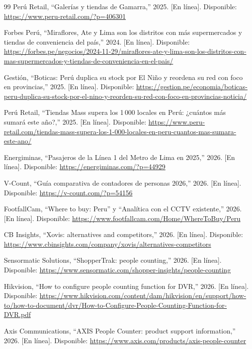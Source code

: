 \documentclass[12pt,a4paper]{article}
\begin{document}
\begin{thebibliography}{99}
Perú Retail, ``Galerías y tiendas de Gamarra,'' 2025. [En línea]. Disponible:
\url{https://www.peru-retail.com/?p=406301}

Forbes Perú, ``Miraflores, Ate y Lima son los distritos con más supermercados y
tiendas de conveniencia del país,'' 2024. [En línea]. Disponible:
\url{https://forbes.pe/negocios/2024-11-29/miraflores-ate-y-lima-son-los-distritos-con-mas-supermercados-y-tiendas-de-conveniencia-en-el-pais/}

Gestión, ``Boticas: Perú duplica su stock por El Niño y reordena su red con foco
en provincias,'' 2025. [En línea]. Disponible:
\url{https://gestion.pe/economia/boticas-peru-duplica-su-stock-por-el-nino-y-reorden-su-red-con-foco-en-provincias-noticia/}

Perú Retail, ``Tiendas Mass supera los 1\,000 locales en Perú: ¿cuántos más
sumará este año?,'' 2025. [En línea]. Disponible:
\url{https://www.peru-retail.com/tiendas-mass-supera-los-1-000-locales-en-peru-cuantos-mas-sumara-este-ano/}

Energiminas, ``Pasajeros de la Línea 1 del Metro de Lima en 2025,'' 2026. [En
línea]. Disponible: \url{https://energiminas.com/?p=44929}

V-Count, ``Guía comparativa de contadores de personas 2026,'' 2026. [En línea].
Disponible: \url{https://v-count.com/?p=54156}

FootfallCam, ``Where to buy: Peru'' y ``Analítica con el CCTV existente,'' 2026.
[En línea]. Disponible:
\url{https://www.footfallcam.com/Home/WhereToBuy/Peru}

CB Insights, ``Xovis: alternatives and competitors,'' 2026. [En línea].
Disponible: \url{https://www.cbinsights.com/company/xovis/alternatives-competitors}

Sensormatic Solutions, ``ShopperTrak: people counting,'' 2026. [En línea].
Disponible: \url{https://www.sensormatic.com/shopper-insights/people-counting}

Hikvision, ``How to configure people counting function for DVR,'' 2026.
[En línea]. Disponible:
\url{https://www.hikvision.com/content/dam/hikvision/en/support/how-to/how-to-document/dvr/How-to-Configure-People-Counting-Function-for-DVR.pdf}

Axis Communications, ``AXIS People Counter: product support information,''
2026. [En línea]. Disponible: \url{https://www.axis.com/products/axis-people-counter}


\end{thebibliography}
\end{document}
